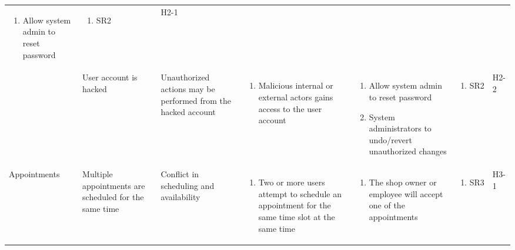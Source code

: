 \documentclass{article}
\begin{document}
\begin{landscape}
\begin{longtable}{|p{}|p{}|p{}|p{}|p{}|p{}|p{}|}
\begin{enumerate}[label=\alph*., leftmargin=*]
			   \item Allow system admin to reset password
		   \end{enumerate}
		 & \begin{enumerate}[label=\alph*., leftmargin=*]
			   \item SR2
		   \end{enumerate}
		 & H2-1                                                                                                         \\
		\cline{2-7}
		 & User account is hacked
		 & Unauthorized actions may be performed from the hacked account
		 & \begin{enumerate}[label=\alph*., leftmargin=*]
			   \item Malicious internal or external actors gains access to the user account
		   \end{enumerate}
		 & \begin{enumerate}[label=\alph*., leftmargin=*]
			   \item Allow system admin to reset password
			   \item System administrators to undo/revert unauthorized changes
		   \end{enumerate}
		 & \begin{enumerate}[label=\alph*., leftmargin=*]
			   \item SR2
		   \end{enumerate}
		 & H2-2                                                                                                         \\
		\hline
		Appointments
		 & Multiple appointments are scheduled for the same time
		 & Conflict in scheduling and availability
		 & \begin{enumerate}[label=\alph*., leftmargin=*]
			   \item Two or more users attempt to schedule an appointment for the same time slot at the same time
		   \end{enumerate}
		 & \begin{enumerate}[label=\alph*., leftmargin=*]
			   \item The shop owner or employee will accept one of the appointments
		   \end{enumerate}
		 & \begin{enumerate}[label=\alph*., leftmargin=*]
			   \item SR3
		   \end{enumerate}
		 & H3-1                                                                                                         \\

\end{longtable}
\end{landscape}
\end{document}
